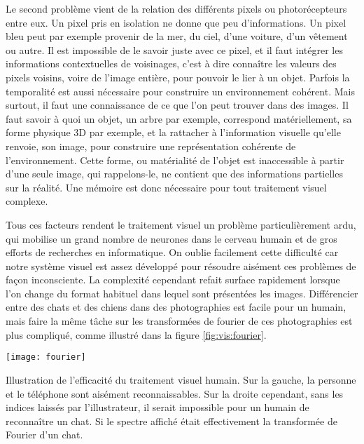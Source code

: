 	Le second problème vient de la relation des différents pixels ou photorécepteurs entre eux. Un pixel pris en isolation ne donne que peu d'informations. Un pixel bleu peut par exemple provenir de la mer, du ciel, d'une voiture, d'un vêtement ou autre. Il est impossible de le savoir juste avec ce pixel, et il faut intégrer les informations contextuelles de voisinages, c'est à dire connaître les valeurs des pixels voisins, voire de l'image entière, pour pouvoir le lier à un objet. Parfois la temporalité est aussi nécessaire pour construire un environnement cohérent. Mais surtout, il faut une connaissance de ce que l'on peut trouver dans des images. Il faut savoir à quoi un objet, un arbre par exemple, correspond matériellement, sa forme physique 3D par exemple, et la rattacher à l'information visuelle qu'elle renvoie, son image, pour construire une représentation cohérente de l'environnement. Cette forme, ou matérialité de l'objet est inaccessible à partir d'une seule image, qui rappelons-le, ne contient que des informations partielles sur la réalité. Une mémoire est donc nécessaire pour tout traitement visuel complexe.

	Tous ces facteurs rendent le traitement visuel un problème particulièrement ardu, qui mobilise un grand nombre de neurones dans le cerveau humain et de gros efforts de recherches en informatique. On oublie facilement cette difficulté car notre système visuel est assez développé pour résoudre aisément ces problèmes de façon inconsciente. La complexité cependant refait surface rapidement lorsque l'on change du format habituel dans lequel sont présentées les images. Différencier entre des chats et des chiens dans des photographies est facile pour un humain, mais faire la même tâche sur les transformées de fourier de ces photographies est plus compliqué, comme illustré dans la figure \ref{fig:vis:fourier}.

	\begin{figureth}
		\texttt{[image: fourier]}
		\caption[Illustration de l'efficacité du traitement visuel humain.]{Illustration de l'efficacité du traitement visuel humain. Sur la gauche, la personne et le téléphone sont aisément reconnaissables. Sur la droite cependant, sans les indices laissés par l'illustrateur, il serait impossible pour un humain de reconnaître un chat. Si le spectre affiché était effectivement la transformée de Fourier d'un chat.\footnotemark}\label{fig:vis:fourier}
	\end{figureth}


